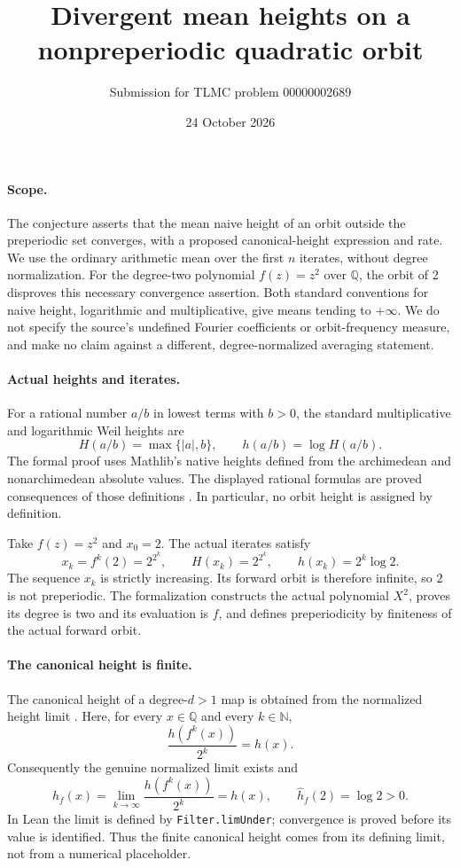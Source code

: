 \documentclass[11pt,a4paper]{article}
\title{Divergent mean heights on a nonpreperiodic quadratic orbit}
\author{Submission for TLMC problem 00000002689}
\date{24 October 2026}
\newcommand{\Q}{\mathbb Q}
\newcommand{\N}{\mathbb N}
\begin{document}
\maketitle

\paragraph{Scope.}
The conjecture asserts that the mean naive height of an orbit outside the
preperiodic set converges, with a proposed canonical-height expression and
rate. We use the ordinary arithmetic mean over the first $n$ iterates,
without degree normalization. For the degree-two polynomial $f(z)=z^2$
over $\Q$, the orbit of $2$ disproves this necessary convergence assertion.
Both standard conventions for naive height, logarithmic and
multiplicative, give means tending to $+\infty$.
We do not specify the source's undefined Fourier coefficients or
orbit-frequency measure, and make no claim against a different,
degree-normalized averaging statement.

\paragraph{Actual heights and iterates.}
For a rational number $a/b$ in lowest terms with $b>0$, the standard
multiplicative and logarithmic Weil heights are
\[
H(a/b)=\max\{|a|,b\},\qquad h(a/b)=\log H(a/b).
\]
The formal proof uses Mathlib's native heights defined from the
archimedean and nonarchimedean absolute values. The displayed rational
formulas are proved consequences of those definitions \cite{height}.
In particular, no orbit height is assigned by definition.

Take $f(z)=z^2$ and $x_0=2$. The actual iterates satisfy
\[
x_k=f^k(2)=2^{2^k},\qquad
H(x_k)=2^{2^k},\qquad h(x_k)=2^k\log2.
\]
The sequence $x_k$ is strictly increasing. Its forward orbit is therefore
infinite, so $2$ is not preperiodic. The formalization constructs the
actual polynomial $X^2$, proves its degree is two and its evaluation is
$f$, and defines preperiodicity by finiteness of the actual forward orbit.

\paragraph{The canonical height is finite.}
The canonical height of a degree-$d>1$ map is obtained from the normalized
height limit \cite{demarco}. Here, for every $x\in\Q$ and every $k\in\N$,
\[
\frac{h(f^k(x))}{2^k}=h(x).
\]
Consequently the genuine normalized limit exists and
\[
\widehat h_f(x)=\lim_{k\to\infty}\frac{h(f^k(x))}{2^k}=h(x),
\qquad \widehat h_f(2)=\log2>0.
\]
In Lean the limit is defined by \texttt{Filter.limUnder}; convergence is
proved before its value is identified. Thus the finite canonical height
comes from its defining limit, not from a numerical placeholder.
\end{document}
